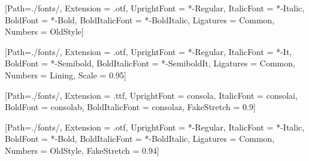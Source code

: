 
\usepackage{fontspec}
\usepackage{xltxtra}


[Path=./fonts/,
  Extension      = .otf,
  UprightFont    = *-Regular,
  ItalicFont     = *-Italic,
  BoldFont       = *-Bold,
  BoldItalicFont = *-BoldItalic,
  Ligatures      = Common,
  Numbers        = OldStyle]


\setsansfont{SourceSans3}[Path=./fonts/,
  Extension      = .otf,
  UprightFont    = *-Regular,
  ItalicFont     = *-It,
  BoldFont       = *-Semibold,
  BoldItalicFont = *-SemiboldIt,
  Ligatures      = Common,
  Numbers        = Lining,
  Scale          = 0.95]
 
\setmonofont{Consolas}[Path=./fonts/,
  Extension      = .ttf,
  UprightFont    = consola,
  ItalicFont     = consolai,
  BoldFont       = consolab,
  BoldItalicFont = consolaz,
  FakeStretch    = 0.9]


[Path=./fonts/,
  Extension      = .otf,
  UprightFont    = *-Regular,
  ItalicFont     = *-Italic,
  BoldFont       = *-Bold,
  BoldItalicFont = *-BoldItalic,
  Ligatures       = Common,
  Numbers         = OldStyle,
  FakeStretch     = 0.94]

